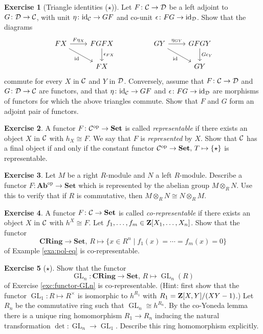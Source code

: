 \documentclass[11pt]{amsbook}
\DeclareMathOperator\GL{GL}
\def\id{{\rm id}}
\def\opp{\mathrm{op}}
\def\Set{\mathbf{Set}}
\def\Ab{\mathbf{Ab}}
\def\CRing{\mathbf{CRing}}
\theoremstyle{plain}
\theoremstyle{definition}
\newtheorem{exercise}{Exercise}
\begin{document}
\begin{exercise}[Triangle identities ($\star$)]
Let $F\colon {\mathcal{C}} \to {\mathcal{D}}$ be a left adjoint to $G\colon {\mathcal{D}} \to {\mathcal{C}}$, with unit $\eta\colon \id_\cC \to GF$ and co-unit $\epsilon\colon FG \to \id_\cD$. Show that the diagrams
\[
\begin{tikzcd}
FX \arrow{r}{F\eta_X} \arrow[swap]{rd}{\id} & FGFX \arrow{d}{\epsilon_{FX}} 
	& & GY \arrow{r}{\eta_{GY}} \arrow[swap]{rd}{\id} & GFGY \arrow{d}{G\epsilon_Y} \\
& FX & & & GY 
\end{tikzcd}
\]
commute for every $X$ in ${\mathcal{C}}$ and $Y$ in ${\mathcal{D}}$. Conversely, assume that  $F\colon {\mathcal{C}} \to {\mathcal{D}}$ and $G\colon {\mathcal{D}} \to {\mathcal{C}}$
are functors, and that  $\eta\colon \id_\cC \to GF$ and $\epsilon\colon FG \to \id_\cD$ are morphisms of functors for which the above triangles commute. Show that $F$ and $G$ form an adjoint pair of functors.
\end{exercise}

\begin{exercise}
A functor $F\colon \cC^\opp \to \Set$ is called \emph{representable} if there exists an object $X$ in ${\mathcal{C}}$ with $h_X \cong F$. We say that $F$ is \emph{represented} by $X$. Show that ${\mathcal{C}}$ has a final object if and only if the constant functor $\cC^\opp \to \Set,\, T\mapsto \{\star\}$ is representable. 
\end{exercise}

\begin{exercise}
Let $M$ be a right $R$-module and $N$ a left $R$-module. Describe a functor $F\colon \Ab^\opp \to \Set$ which is represented by the abelian group $M\otimes_R N$. Use this to verify that if $R$ is commutative, then $M\otimes_R N \cong N\otimes_R M$.
\end{exercise}


\begin{exercise}
A functor $F\colon \cC\to \Set$ is called \emph{co-representable} if there exists an object $X$ in ${\mathcal{C}}$ with $h^X\cong F$. 
Let $f_1,\ldots, f_m \in {\mathbf{Z}}[X_1,\ldots,X_n]$. Show that the functor
\[
	\CRing \to \Set,\, R \mapsto \{ x\in R^n \mid f_1(x)=\cdots=f_m(x)=0 \}
\]
of Example \ref{exa:pol-eq} is co-representable.
\end{exercise}

\begin{exercise}[$\star$]
Show that the functor
\[
	\GL_n\colon \CRing \to \Set,\, R \mapsto \GL_n(R)
\]
of Exercise \ref{exc:functor-GLn} is co-representable. (Hint: first show that the functor $\GL_1\colon R \mapsto R^\times$ is isomorphic to $h^{R_1}$ with $R_1={\mathbf{Z}}[X,Y]/(XY-1)$.) Let $R_n$ be the commutative ring such that $\GL_n \cong h^{R_n}$. By the co-Yoneda lemma there is a unique ring homomorphism
$R_1\to R_n$ inducing the natural transformation $\det\colon \GL_n\to \GL_1$. Describe  this ring homomorphism explicitly. 
\end{exercise}
\end{document}
